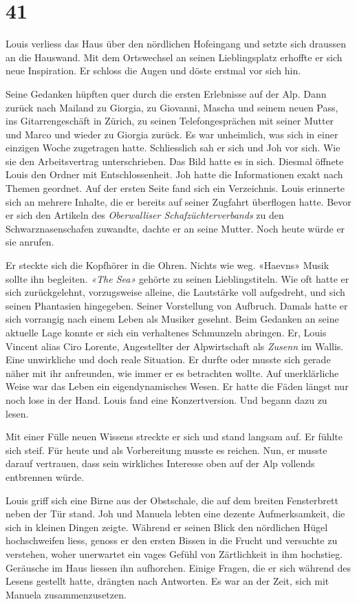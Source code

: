 \chapter{41}



Louis verliess das Haus über den nördlichen Hofeingang und setzte sich
draussen an die Hauswand. Mit dem Ortswechsel an seinen Lieblingsplatz erhoffte er sich neue Inspiration. Er schloss die
Augen und döste erstmal vor sich hin. 

Seine Gedanken hüpften quer durch die ersten Erlebnisse auf der Alp.
Dann zurück nach Mailand zu Giorgia, zu Giovanni, Mascha und seinem
neuen Pass, ins Gitarrengeschäft in Zürich, zu seinen Telefongesprächen
mit seiner Mutter und Marco und wieder zu Giorgia zurück. Es war unheimlich, was sich in einer einzigen Woche zugetragen
hatte. Schliesslich sah er sich und Joh vor sich. Wie sie den
Arbeitsvertrag unterschrieben. Das Bild hatte es in sich. 
Diesmal öffnete Louis den Ordner mit Entschlossenheit. Joh hatte die Informationen exakt
nach Themen geordnet. Auf der ersten Seite fand sich ein Verzeichnis.
Louis erinnerte sich an mehrere Inhalte, die er bereits auf seiner
Zugfahrt überflogen hatte. Bevor er sich den Artikeln des
\emph{Oberwalliser Schafzüchterverbands} zu den Schwarznasenschafen
zuwandte, dachte er an seine Mutter. Noch heute würde er sie anrufen.

Er steckte sich die Kopfhörer in die Ohren. Nichts wie weg. «Haevns» Musik sollte ihn begleiten. \emph{«The
Sea»} gehörte zu seinen Lieblingstiteln. Wie oft hatte er sich
zurückgelehnt, vorzugsweise alleine, die Lautstärke voll aufgedreht, und
sich seinen Phantasien hingegeben. Seiner Vorstellung von Aufbruch.
Damals hatte er sich vorrangig nach einem Leben als 
Musiker gesehnt. Beim Gedanken an seine aktuelle Lage konnte er sich ein 
verhaltenes Schmunzeln abringen. Er, Louis Vincent alias Ciro Lorente,
Angestellter der Alpwirtschaft als \emph{Zusenn} im Wallis. Eine
unwirkliche und doch reale Situation. Er durfte oder musste sich gerade
näher mit ihr anfreunden, wie immer er es betrachten wollte. Auf
unerklärliche Weise war das Leben ein eigendynamisches Wesen. Er hatte
die Fäden längst nur noch lose in der Hand.
Louis fand eine Konzertversion. Und begann dazu zu lesen.


Mit einer Fülle neuen Wissens streckte er sich und stand langsam auf. Er fühlte sich
steif. Für heute und als Vorbereitung musste es reichen. Nun, er musste darauf vertrauen, dass sein wirkliches Interesse oben auf
der Alp vollends entbrennen würde. 

Louis griff sich eine Birne aus der Obstschale, die auf dem breiten
Fensterbrett neben der Tür stand. Joh und Manuela lebten eine dezente
Aufmerksamkeit, die sich in kleinen Dingen zeigte. Während er seinen
Blick den nördlichen Hügel hochschweifen liess, genoss er den ersten
Bissen in die Frucht und versuchte zu verstehen, woher unerwartet ein
vages Gefühl von Zärtlichkeit in ihm hochstieg.
Geräusche im Haus liessen ihn aufhorchen. Einige Fragen, die er sich
während des Lesens gestellt hatte, drängten nach Antworten. Es war an
der Zeit, sich mit Manuela zusammenzusetzen. 